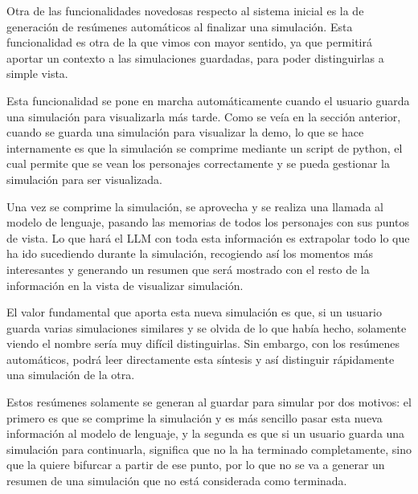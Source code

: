 Otra de las funcionalidades novedosas respecto al sistema inicial es la de generación de resúmenes automáticos al finalizar una simulación. Esta funcionalidad es otra de la que vimos con mayor sentido, ya que permitirá aportar un contexto a las simulaciones guardadas, para poder distinguirlas a simple vista.

Esta funcionalidad se pone en marcha automáticamente cuando el usuario guarda una simulación para visualizarla más tarde. Como se veía en la sección anterior, cuando se guarda una simulación para visualizar la demo, lo que se hace internamente es que la simulación se comprime mediante un script de python, el cual permite que se vean los personajes correctamente y se pueda gestionar la simulación para ser visualizada.

Una vez se comprime la simulación, se aprovecha y se realiza una llamada al modelo de lenguaje, pasando las memorias de todos los personajes con sus puntos de vista. Lo que hará el LLM con toda esta información es extrapolar todo lo que ha ido sucediendo durante la simulación, recogiendo así los momentos más interesantes y generando un resumen que será mostrado con el resto de la información en la vista de visualizar simulación.

El valor fundamental que aporta esta nueva simulación es que, si un usuario guarda varias simulaciones similares y se olvida de lo que había hecho, solamente viendo el nombre sería muy difícil distinguirlas. Sin embargo, con los resúmenes automáticos, podrá leer directamente esta síntesis y así distinguir rápidamente una simulación de la otra.

Estos resúmenes solamente se generan al guardar para simular por dos motivos: el primero es que se comprime la simulación y es más sencillo pasar esta nueva información al modelo de lenguaje, y la segunda es que si un usuario guarda una simulación para continuarla, significa que no la ha terminado completamente, sino que la quiere bifurcar a partir de ese punto, por lo que no se va a generar un resumen de una simulación que no está considerada como terminada.










